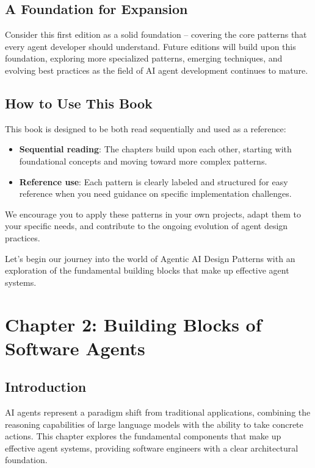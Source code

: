 \documentclass[11pt,oneside]{book}
\providecommand{\tightlist}{%
  \setlength{\itemsep}{0pt}\setlength{\parskip}{0pt}}
\begin{document}
\section{A Foundation for Expansion}\label{a-foundation-for-expansion}

Consider this first edition as a solid foundation -- covering the core
patterns that every agent developer should understand. Future editions
will build upon this foundation, exploring more specialized patterns,
emerging techniques, and evolving best practices as the field of AI
agent development continues to mature.

\section{How to Use This Book}\label{how-to-use-this-book}

This book is designed to be both read sequentially and used as a
reference:

\begin{itemize}
\tightlist
\item
  \textbf{Sequential reading}: The chapters build upon each other,
  starting with foundational concepts and moving toward more complex
  patterns.
\item
  \textbf{Reference use}: Each pattern is clearly labeled and structured
  for easy reference when you need guidance on specific implementation
  challenges.
\end{itemize}

We encourage you to apply these patterns in your own projects, adapt
them to your specific needs, and contribute to the ongoing evolution of
agent design practices.

Let's begin our journey into the world of Agentic AI Design Patterns with
an exploration of the fundamental building blocks that make up effective
agent systems.

\chapter{Chapter 2: Building Blocks of Software
Agents}\label{chapter-2-building-blocks-of-software-agents}

\section{Introduction}\label{introduction-1}

AI agents represent a paradigm shift from traditional applications,
combining the reasoning capabilities of large language models with the
ability to take concrete actions. This chapter explores the fundamental
components that make up effective agent systems, providing software
engineers with a clear architectural foundation.
\end{document}
